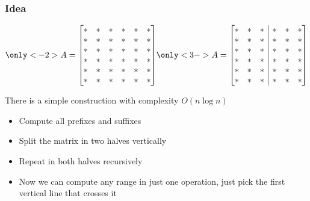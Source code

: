 \documentclass{beamer}
\begin{document}
\begin{frame}
\frametitle{Idea}


\begin{equation*}\only<-2>{A=\left[
\begin{array}{@{}cccccc@{}}
     \ast & \ast  & \ast  & \ast  & \ast  & \ast  \\
     \ast & \ast & \ast  & \ast  & \ast  & \ast  \\
     \ast & \ast & \ast  & \ast  & \ast  & \ast  \\
     \ast & \ast & \ast  & \ast  & \ast  & \ast  \\
     \ast & \ast & \ast  & \ast  & \ast  & \ast  \\
     \ast & \ast & \ast  & \ast  & \ast  & \ast  \\
    \end{array}
    \right]}
\only<3->{
A=\left[
\begin{array}{@{}ccc|ccc@{}}
     \ast & \ast  & \ast  & \ast  & \ast  & \ast  \\
     \ast & \ast & \ast  & \ast  & \ast  & \ast  \\
     \ast & \ast & \ast  & \ast  & \ast  & \ast  \\
     \ast & \ast & \ast  & \ast  & \ast  & \ast  \\
     \ast & \ast & \ast  & \ast  & \ast  & \ast  \\
     \ast & \ast & \ast  & \ast  & \ast  & \ast  \\
    \end{array}
    \right]
}
\end{equation*}

There is a simple construction with complexity $O(n \log n)$

\pause

\begin{itemize}[<+->]
\item Compute all prefixes and suffixes
\item Split the matrix in two halves vertically
\item Repeat in both halves recursively
\item Now we can compute any range in just one operation, just pick the first vertical line that crosses it
\end{itemize}

\end{frame}
\end{document}
